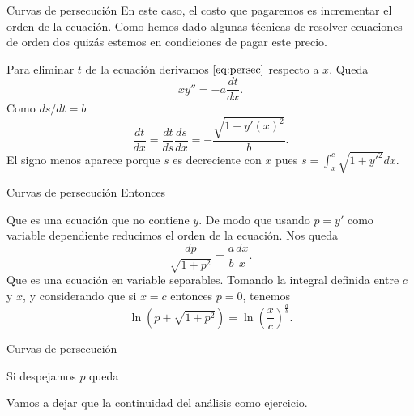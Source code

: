 \documentclass[handout,hyperref={colorlinks=true}]{beamer}
\begin{document}
\begin{frame}{Curvas de persecución}
 En este caso, el costo que pagaremos 
 es incrementar el orden de la ecuación. 
 Como hemos dado algunas técnicas de  resolver ecuaciones de orden dos quizás estemos en condiciones de pagar este precio.
 
Para eliminar $t$ de la ecuación derivamos $\eqref{eq:persec}$ respecto a $x$. Queda
\[xy''=-a\frac{dt}{dx}.\]
Como $ds/dt=b$ 
\[\frac{dt}{dx}=\frac{dt}{ds}\frac{ds}{dx}=-\frac{\sqrt{1+y'(x)^2}}{b}.\]
El signo menos aparece porque $s$ es decreciente con $x$ pues $s=\int_x^c\sqrt{1+y'^2}dx$.
 
\end{frame}

\begin{frame}{Curvas de persecución}
 Entonces 
 
Que es una ecuación que no contiene $y$. De modo que usando $p=y'$ como variable dependiente reducimos el orden de la ecuación. Nos queda
\[\frac{dp}{\sqrt{1+p^2}}=\frac{a}{b}\frac{dx}{x}.\]
Que es una ecuación en variable separables. Tomando la integral definida entre $c$ y $x$, y considerando que si $x=c$ entonces $p=0$, tenemos
\[\ln\left(p+\sqrt{1+p^2}\right)=\ln\left( \frac{x}{c}\right)^{\tfrac{a}{b}}.\]
 
 
\end{frame}

\begin{frame}{Curvas de persecución}

Si despejamos $p$ queda


Vamos a dejar que la continuidad del análisis como ejercicio.
 
 
\end{frame}
\end{document}
